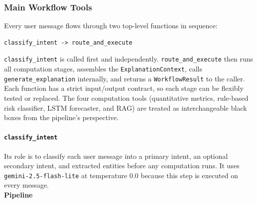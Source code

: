\subsubsection{Main Workflow Tools}
Every user message flows through two top-level functions in sequence:

\begin{lstlisting}
classify_intent -> route_and_execute
\end{lstlisting}

\texttt{classify\_intent} is called first and independently. \texttt{route\_and\_execute} then runs
all computation stages, assembles the \texttt{ExplanationContext}, calls \texttt{generate\_explanation} internally, and returns a \texttt{WorkflowResult} to the caller.\\

Each function has a strict input/output contract, so each stage can be flexibly tested or replaced. The four computation tools (quantitative metrics, rule-based risk classifier, LSTM forecaster, and RAG) are treated as interchangeable black boxes from the pipeline's perspective.


\paragraph{\texttt{classify\_intent}}
Its role is to classify each user message into a primary intent, an optional secondary intent, and extracted entities before any computation runs. It uses \texttt{gemini-2.5-flash-lite} at temperature 0.0 because this step is executed on every message.\\

\textbf{Pipeline}

